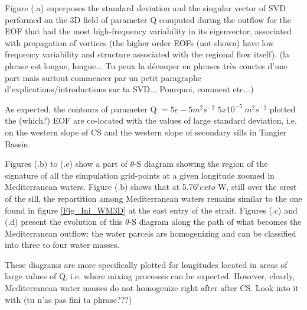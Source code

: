 \color{blue}Figure (.a) superposes the standard deviation and \color{black} the singular vector of SVD performed on the 3D field of parameter Q computed during the outflow for the EOF that had the most high-frequency variability in its eigenvector, associated with propagation of vortices (the higher order EOFs (not shown) have low frequency variability and structure associated with the regional flow itself). \color{green}(la phrase est longue, longue... Tu peux la découper en phrases très courtes d'une part mais surtout commencer par un petit paragraphe d'explications/introductions sur ta SVD... Pourquoi, comment etc...) \color{black}

As expected, the contours of parameter Q  \color{blue}\sout{$=5e-5m^2s^{-2}$} $5x10^{-5}\ m^2s^{-2}$ plotted the  \color{green}(which?) \color{blue} EOF are co-located with the values of large standard deviation, i.e. on the western slope of CS and the western slope of secondary sills in Tangier Bassin. \color{black} 

\color{blue}Figures (.b) to (.e) show a \color{blue}part \color{black} of $\theta$-S diagram showing  the region of the signature of all the simpulation grid-points at a given longitude zoomed in Mediterranean waters. Figure (.b) shows that at 5.76$^text{o}$ W, still over the crest of the sill, the repartition among Mediterranean waters remains similar to \color{black} the one found in figure \ref{Fig_Ini_WM3D} at the east entry of the strait. \color{blue}Figures (.c) and (.d) present the evolution of this $\theta$-S diagram along the path of what becomes the Mediterranean outflow: \color{black} the water parcels are homogenizing and can be classified into three to four water masses.

These diagrams are \color{blue}more specifically \color{black} plotted for longitudes located in areas of large values of Q, i.e. where mixing processes can be expected. However, clearly, Mediterranean water masses do not homogenize right after after CS.  \color{green}Look into it with (tu n'as pas fini ta phrase???) \color{black}

